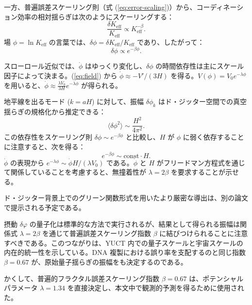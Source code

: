 \documentclass[11pt,a4paper]{article}
\newcommand{\Keff}{K_{\mathrm{eff}}}
\begin{document}
	一方、普遍誤差スケーリング則（式 (\ref{eq:error-scaling})）から、コーディネーション効率の相対揺らぎは次のようにスケーリングする：
	\begin{equation}
		\frac{\delta\Keff}{\Keff} \propto \Keff^{-\beta}.
	\end{equation}
	場 \(\phi = \ln\Keff\) の言葉では、\(\delta\phi = \delta\Keff/\Keff\) であり、したがって：
	\begin{equation}
		\delta\phi \propto e^{-\beta\phi}.
	\end{equation}
	
	スローロール近似では、\(\dot{\phi}\) はゆっくり変化し、\(\delta\phi\) の時間依存性は主にスケール因子によって決まる。(\ref{eq:field}) から \(\dot{\phi} \approx -V'/(3H)\) を得る。\(V(\phi) = V_0 e^{-\lambda\phi}\) を用いると、\(\dot{\phi} \approx \frac{\lambda V_0}{3H} e^{-\lambda\phi}\) が得られる。
	
	地平線を出るモード (\(k = aH\)) に対して、振幅 \(\delta\phi_k\) はド・ジッター空間での真空揺らぎの規格化から推定できる：
	\begin{equation}
		\langle \delta\phi^2 \rangle \sim \frac{H^2}{4\pi^2}.
	\end{equation}
	この依存性をスケーリング則 \(\delta\phi \sim e^{-\beta\phi}\) と比較し、\(H\) が \(\phi\) に弱く依存することに注意すると、次を得る：
	\begin{equation}
		e^{-\beta\phi} \sim \text{const} \cdot H.
	\end{equation}
	\(\dot{\phi}\) の表現から \(e^{-\lambda\phi} \sim \dot{\phi} H / (\lambda V_0)\) である。\(\dot{\phi}\) と \(H\) がフリードマン方程式を通じて関係していることを考慮すると、無撞着性が \(\lambda = 2\beta\) を要求することが示せる。
	
	ド・ジッター背景上でのグリーン関数形式を用いたより厳密な導出は、別の論文で提示される予定である。
	
	摂動 \(\delta\varphi\) の量子化は標準的な方法で実行されるが、結果として得られる振幅は関係式 \(\lambda = 2\beta\) を通じて普遍誤差スケーリング指数 \(\beta\) に結びつけられることに注意すべきである。このつながりは、YUCT 内での量子スケールと宇宙スケールの内在的統一性を示している。DNA 複製における誤り率を支配するのと同じ指数 \(\beta = 0.67\) が、原始量子揺らぎの振幅をも決定するのである。
	
	かくして、普遍的フラクタル誤差スケーリング指数 \(\beta = 0.67\) は、ポテンシャルパラメータ \(\lambda = 1.34\) を直接決定し、本文中で観測的予測を得るために使用された。
	
\end{document}
